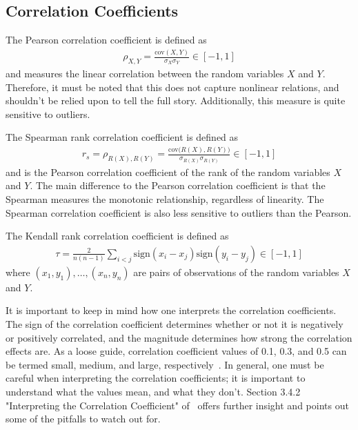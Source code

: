 \subsection{Correlation Coefficients}\label{app:correlation_coefficients}
The Pearson correlation coefficient is defined as
\begin{align}
    \rho_{X,Y} = \frac{\text{cov}{(X,Y)}}{\sigma_X \sigma_Y} \in [-1, 1]
\end{align}
and measures the linear correlation between the random variables \( X \) and \( Y \).
Therefore, it must be noted that this does not capture nonlinear relations, and shouldn't be relied upon to tell the full story.
Additionally, this measure is quite sensitive to outliers.

The Spearman rank correlation coefficient is defined as
\begin{align}
    r_s = \rho_{R(X),R(Y)} = \frac{\text{cov}{\big(R(X),R(Y)\big)}}{\sigma_{R(X)} \sigma_{R(Y)}} \in [-1, 1]
\end{align}
and is the Pearson correlation coefficient of the rank of the random variables \( X \) and \( Y \).
The main difference to the Pearson correlation coefficient is that the Spearman measures the monotonic relationship, regardless of linearity.
The Spearman correlation coefficient is also less sensitive to outliers than the Pearson.

The Kendall rank correlation coefficient is defined as
\begin{align}
    \tau = \frac{2}{n(n-1)} \sum_{i<j} \text{sign}(x_i - x_j) \text{sign}(y_i - y_j) \in [-1, 1]
\end{align}
where \( (x_1, y_1), \dots, (x_n, y_n) \) are pairs of observations of the random variables \( X \) and \( Y \).

It is important to keep in mind how one interprets the correlation coefficients.
The sign of the correlation coefficient determines whether or not it is negatively or positively correlated, and the magnitude determines how strong the correlation effects are.
As a loose guide, correlation coefficient values of 0.1, 0.3, and 0.5 can be termed small, medium, and large, respectively~\cite{research_design_and_statistical_analysis}.
In general, one must be careful when interpreting the correlation coefficients; it is important to understand what the values mean, and what they don't.
Section 3.4.2 "Interpreting the Correlation Coefficient" of~\cite{research_design_and_statistical_analysis} offers further insight and points out some of the pitfalls to watch out for.


